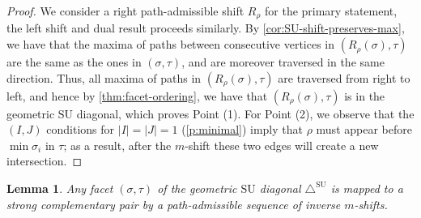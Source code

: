 \documentclass{amsart}
\newtheorem{lemma}[theorem]{Lemma}
\theoremstyle{definition}
\newcommand{\SU}{\mathrm{SU}}
\newcommand{\SUD}{\triangle^{\mathrm{SU}}}
\begin{document}
\begin{proof}
We consider a right path-admissible shift $R_\rho$ for the primary statement, the left shift and dual result proceeds similarly. 
By \cref{cor:SU-shift-preserves-max}, we have that the maxima of paths between consecutive vertices in $(R_{\rho}(\sigma),\tau)$ are the same as the ones in $(\sigma,\tau)$, and are moreover traversed in the same direction.
Thus, all maxima of paths in $(R_{\rho}(\sigma),\tau)$ are traversed from right to left, and hence by \cref{thm:facet-ordering}, we have that $(R_{\rho}(\sigma),\tau)$ is in the geometric $\SU$ diagonal, which proves Point (1).
For Point (2), we observe that the $(I,J)$ conditions for $|I|=|J|=1$ (\cref{p:minimal}) imply that $\rho$ must appear before $\min \sigma_i$ in $\tau$; as a result, after the $m$-shift these two edges will create a new intersection.
\end{proof}

\begin{lemma}
\label{lem:inverse-to-SCP}
Any facet $(\sigma,\tau)$ of the geometric $\SU$ diagonal $\SUD$ is mapped to a strong complementary pair by a path-admissible sequence of inverse $m$-shifts.
\end{lemma}
\end{document}
